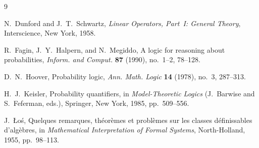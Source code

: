 \documentclass{amsproc}
\theoremstyle{definition}
\begin{document}
\begin{thebibliography}{9}

N.~Dunford and J.~T.~Schwartz,
\textit{Linear Operators, Part~I: General Theory},
Interscience, New York, 1958.

R.~Fagin, J.~Y.~Halpern, and N.~Megiddo,
A logic for reasoning about probabilities,
\textit{Inform. and Comput.} \textbf{87} (1990), no.~1--2, 78--128.

D.~N.~Hoover,
Probability logic,
\textit{Ann. Math. Logic} \textbf{14} (1978), no.~3, 287--313.

H.~J.~Keisler,
Probability quantifiers,
in \textit{Model-Theoretic Logics} (J.~Barwise and S.~Feferman, eds.),
Springer, New York, 1985, pp.~509--556.

J.~\L{}o\'s,
Quelques remarques, th\'eor\`emes et probl\`emes sur les classes
d\'efinissables d'alg\`ebres,
in \textit{Mathematical Interpretation of Formal Systems},
North-Holland, 1955, pp.~98--113.

\end{thebibliography}
\end{document}
